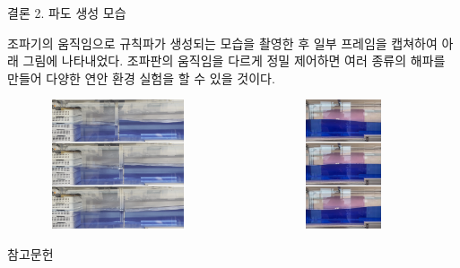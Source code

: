 \documentclass[Junlampaper, portrait]{Junlam_PosterK}
\begin{document}
\begin{poster}
\begin{posterbox}[name=result,column=3,]{결론  }
\small {2. 파도 생성 모습\\}
    \scriptsize{
    
    조파기의 움직임으로 규칙파가 생성되는 모습을 촬영한 후 일부 프레임을 캡쳐하여 아래 그림에 나타내었다. 조파판의 움직임을 다르게 정밀 제어하면 여러 종류의 해파를 만들어 다양한 연안 환경 실험을 할 수 있을 것이다.\\}
            \includegraphics[trim=0 0 0 0, clip, width=0.49\textwidth, 
                height=3.8cm,
                ]
                {images/vlcsnap-2023-06-29-10h35m08s932-1.png} 
            \includegraphics[trim=0 0 0 0, clip, width=0.49\textwidth, 
                height=3.8cm,
                ]
                {images/vlcsnap-2023-06-29-10h53m08s226-1.png} 
        \label{result}   
\end{posterbox}

\begin{posterbox}[name=refs,column=3,below=result]{참고문헌}
\tiny


\end{posterbox}

\end{poster}
\end{document}
